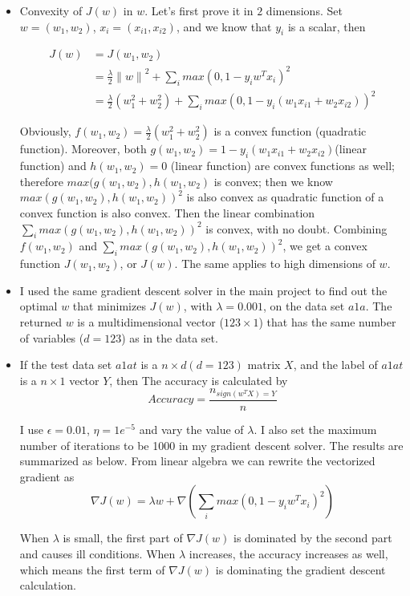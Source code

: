 \begin{itemize}
\item Convexity of $J(w)$ in $w$. Let's first prove it in $2$ dimensions. Set $w=(w_1,w_2)$, $x_i=(x_{i1},x_{i2})$, and we know that $y_i$ is a scalar, then 

\begin{align*}
J(w)&=J(w_1,w_2)\\
&=\frac{\lambda}{2} {\|w\|}^2+ \sum_i max(0,1-y_i w^T x_i)^2 
\\
&= \frac{\lambda}{2}(w_1^2+w_2^2) + \sum_i max(0,1-y_i (w_1 x_{i1}+w_2 x_{i2}))^2
\end{align*}

Obviously, $f(w_1,w_2)=\frac{\lambda}{2}(w_1^2+w_2^2) $ is a convex function (quadratic function). Moreover, both $g(w_1,w_2)=1-y_i (w_1 x_{i1}+w_2 x_{i2})$(linear function) and $h(w_1,w_2)=0$ (linear function) are convex functions as well; therefore $max(g(w_1,w_2),h(w_1,w_2)$ is convex; then we know $max(g(w_1,w_2),h(w_1,w_2))^2$ is also convex as quadratic function of a convex function is also convex. Then the linear combination $\sum_i max(g(w_1,w_2),h(w_1,w_2))^2$ is convex, with no doubt. Combining $f(w_1,w_2)$ and $\sum_i max(g(w_1,w_2),h(w_1,w_2))^2$, we get a convex function $J(w_1,w_2)$, or $J(w)$. The same applies to high dimensions of $w$.

\item I used the same gradient descent solver in the main project to find out the optimal $w$ that minimizes $J(w)$, with $\lambda=0.001$, on the data set $a1a$. The returned $w$ is a multidimensional vector ($123\times 1$) that has the same number of variables ($d=123$) as in the data set. 

\item If the test data set $a1at$ is a $n\times d (d=123)$ matrix $X$, and the label of $a1at$ is a $n\times 1$ vector $Y$, 
then The accuracy is calculated by 
\[
Accuracy=\frac{n_{sign(w^TX) = Y}}{n}
\]

I use $\epsilon=0.01$, $\eta=1e^{-5}$ and vary the value of $\lambda$. I also set the maximum number of iterations to be 1000 in my gradient descent solver. The results are summarized as below. From linear algebra we can rewrite the vectorized gradient as 
\[
\nabla J(w) = \lambda w + \nabla(\sum_i max(0,1-y_i w^T x_i)^2)
\]

When $\lambda$ is small, the first part of $\nabla J(w)$ is dominated by the second part and causes ill conditions. When $\lambda$ increases, the accuracy increases as well, which means the first term of $\nabla J(w)$ is dominating the gradient descent calculation. 


\end{itemize}
